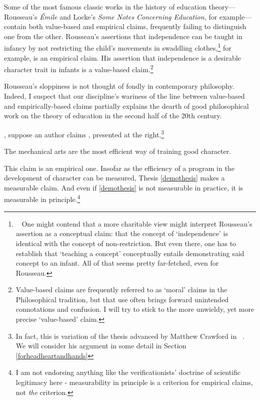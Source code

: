 Some of the most famous classic works in the history of education theory---Rousseau's \emph{Émile} and Locke's \emph{Some Notes Concerning Education,} for example---contain both value-based and empirical claims, frequently failing to distinguish one from the other. Rousseau's assertions that independence can be taught in infancy by not restricting the child's movements in swaddling clothes,\footnote{~\citep[p. 42]{Rousseau:2007vp} One might contend that a more charitable view might interpret Rousseau's assertion as a conceptual claim: that the concept of `independence' is identical with the concept of non-restriction. But even there, one has to establish that `teaching a concept' conceptually entails demonstrating said concept to an infant. All of that seems pretty far-fetched, even for Rousseau.} for example, is an empirical claim. His assertion that independence is a desirable character trait in infants is a value-based claim.\footnote{Value-based claims are frequently referred to as `moral' claims in the Philosophical tradition, but that use often brings forward unintended connotations and confusion. I will try to stick to the more unwieldy, yet more precise `value-based' claim.} 

Rousseau's sloppiness is not thought of fondly in contemporary philosophy. Indeed, I suspect that our discipline's wariness of the line between value-based and empirically-based claims partially explains the dearth of good philosophical work on the theory of education in the second half of the 20th century. 

, suppose an author claims , presented at the right.\footnote{In fact, this is variation of the thesis advanced by Matthew Crawford in ~\citep{Crawford:2009tz}. We will consider his argument in some detail in Section \ref{forheadheartandhands}}\begin{thesis}\label{demothesis}
The mechanical arts are the most efficient way of training good character. \end{thesis}

\begin{quote}
\end{quote}

This claim is an empirical one. Insofar as the efficiency of a program in the development of character can be measured, Thesis \ref{demothesis} makes a measurable claim. And even if \ref{demothesis} is not measurable in practice, it is measurable in principle.\footnote{I am not endorsing anything like the verificationists' doctrine of scientific legitimacy here - measurability in principle is a criterion for empirical claims, not \emph{the} criterion.} 

